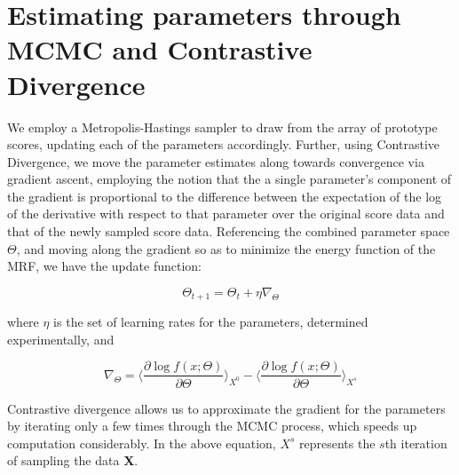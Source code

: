 \documentclass{article}
\begin{document}

%
%
%


\section{Estimating parameters through MCMC and Contrastive Divergence}
We employ a Metropolis-Hastings sampler to draw from the array of prototype scores, updating each of the parameters accordingly.  Further, using Contrastive Divergence, we move the parameter estimates along towards convergence via gradient ascent, employing the notion that the a single parameter's component of the gradient is proportional to the difference between the expectation of the log of the derivative with respect to that parameter over the original score data and that of the newly sampled score data.  Referencing the combined parameter space $\Theta$, and moving along the gradient so as to minimize the energy function of the MRF, we have the update function:

\[\Theta_{t+1} = \Theta_t + \eta\nabla_{\Theta}\]

where $\eta$ is the set of learning rates for the parameters, determined experimentally, and

\[\nabla_{\Theta} = \langle\frac{\partial\log{f(x;\Theta)}}{\partial\Theta}\rangle_{X^0} - \langle\frac{\partial\log{f(x;\Theta)}}{\partial\Theta}\rangle_{X^s}\]

Contrastive divergence allows us to approximate the gradient for the parameters by iterating only a few times through the MCMC process, which speeds up computation considerably.  In the above equation, $X^s$ represents the $s$th iteration of sampling the data {\bf X}.
\end{document}
